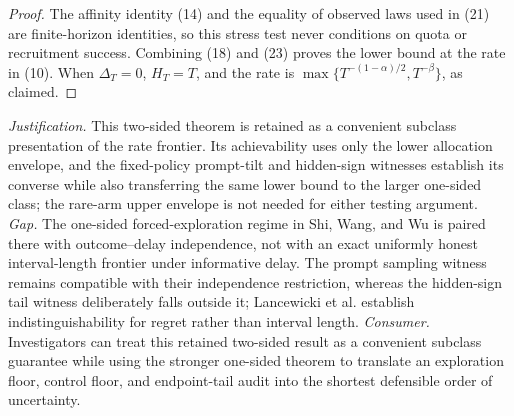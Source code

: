 \documentclass{article}
\begin{document}
\begin{proof}
The affinity identity (14) and the equality of observed laws used in (21) are finite-horizon identities, so this stress test never conditions on quota or recruitment success.  Combining (18) and (23) proves the lower bound at the rate in (10).  When \(\Delta_T=0\), \(H_T=T\), and the rate is \(\max\{T^{-(1-\alpha)/2},T^{-\beta}\}\), as claimed.
\end{proof}
\par\smallskip\noindent \textit{Justification.} This two-sided theorem is retained as a convenient subclass presentation of the rate frontier. Its achievability uses only the lower allocation envelope, and the fixed-policy prompt-tilt and hidden-sign witnesses establish its converse while also transferring the same lower bound to the larger one-sided class; the rare-arm upper envelope is not needed for either testing argument. \textit{Gap.} The one-sided forced-exploration regime in Shi, Wang, and Wu is paired there with outcome--delay independence, not with an exact uniformly honest interval-length frontier under informative delay. The prompt sampling witness remains compatible with their independence restriction, whereas the hidden-sign tail witness deliberately falls outside it; Lancewicki et al. establish indistinguishability for regret rather than interval length. \textit{Consumer.} Investigators can treat this retained two-sided result as a convenient subclass guarantee while using the stronger one-sided theorem to translate an exploration floor, control floor, and endpoint-tail audit into the shortest defensible order of uncertainty.
\end{document}
